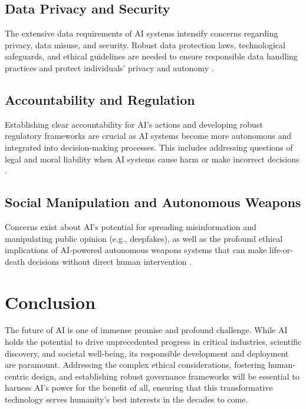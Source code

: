 \subsection{Data Privacy and Security}

The extensive data requirements of AI systems intensify concerns regarding privacy, data misuse, and security. Robust data protection laws, technological safeguards, and ethical guidelines are needed to ensure responsible data handling practices and protect individuals' privacy and autonomy \parencite{boppiniti2022ethical}.

\subsection{Accountability and Regulation}

Establishing clear accountability for AI's actions and developing robust regulatory frameworks are crucial as AI systems become more autonomous and integrated into decision-making processes. This includes addressing questions of legal and moral liability when AI systems cause harm or make incorrect decisions \parencite{boppiniti2022ethical}.

\subsection{Social Manipulation and Autonomous Weapons}

Concerns exist about AI's potential for spreading misinformation and manipulating public opinion (e.g., deepfakes), as well as the profound ethical implications of AI-powered autonomous weapons systems that can make life-or-death decisions without direct human intervention \parencite{boppiniti2022ethical}.

\section{Conclusion}

The future of AI is one of immense promise and profound challenge. While AI holds the potential to drive unprecedented progress in critical industries, scientific discovery, and societal well-being, its responsible development and deployment are paramount. Addressing the complex ethical considerations, fostering human-centric design, and establishing robust governance frameworks will be essential to harness AI's power for the benefit of all, ensuring that this transformative technology serves humanity's best interests in the decades to come.